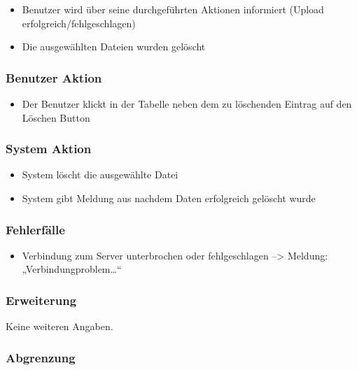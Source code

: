 \documentclass[a4paper,12pt]{article}
\begin{document}
\begin{itemize}

\item
  Benutzer wird über seine durchgeführten Aktionen informiert (Upload
  erfolgreich/fehlgeschlagen)
\item
  Die ausgewählten Dateien wurden gelöscht
\end{itemize}

\subsubsection{Benutzer Aktion}\label{benutzer-aktion-13}

\begin{itemize}

\item
  Der Benutzer klickt in der Tabelle neben dem zu löschenden Eintrag auf
  den Löschen Button
\end{itemize}

\subsubsection{System Aktion}\label{system-aktion-13}

\begin{itemize}

\item
  System löscht die ausgewählte Datei
\item
  System gibt Meldung aus nachdem Daten erfolgreich gelöscht wurde
\end{itemize}

\subsubsection{Fehlerfälle}\label{fehlerfalle-13}

\begin{itemize}

\item
  Verbindung zum Server unterbrochen oder fehlgeschlagen
  --\textgreater{} Meldung: „Verbindungproblem\ldots{}``
\end{itemize}

\subsubsection{Erweiterung}\label{erweiterung-13}
Keine weiteren Angaben.

\subsubsection{Abgrenzung}\label{abgrenzung-13}
\end{document}
